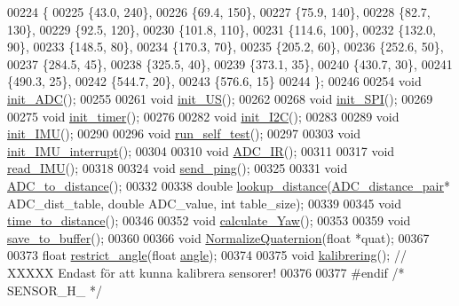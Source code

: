 \begin{DoxyCode}
00224 \{
00225     \{43.0, 240\},
00226     \{69.4, 150\},
00227     \{75.9, 140\},
00228     \{82.7, 130\},
00229     \{92.5, 120\},
00230     \{101.8, 110\},
00231     \{114.6, 100\},
00232     \{132.0, 90\},
00233     \{148.5, 80\},
00234     \{170.3, 70\},
00235     \{205.2, 60\},
00236     \{252.6, 50\},
00237     \{284.5, 45\},
00238     \{325.5, 40\},
00239     \{373.1, 35\},
00240     \{430.7, 30\},
00241     \{490.3, 25\},
00242     \{544.7, 20\},
00243     \{576.6, 15\}
00244 \};  
00246 
00254 \textcolor{keywordtype}{void} \hyperlink{sensor_8h_a342ab07b607f3dc4efa0655ca1acd164}{init\_ADC}();
00255 
00261 \textcolor{keywordtype}{void} \hyperlink{sensor_8h_a16afe9a4d2627f3f7f1bab054d4ad7ad}{init\_US}();
00262 
00268 \textcolor{keywordtype}{void} \hyperlink{sensor_8h_a1065be4c03eff55f82e136ccb95a2854}{init\_SPI}();
00269 
00275 \textcolor{keywordtype}{void} \hyperlink{sensor_8h_a38016ab7b2931bcb950e0c6f3ba3f342}{init\_timer}();
00276 
00282 \textcolor{keywordtype}{void} \hyperlink{sensor_8h_a87c8819d26491fb701918e147117710c}{init\_I2C}();
00283 
00289 \textcolor{keywordtype}{void} \hyperlink{sensor_8h_a1009b8de0745458d734bd73beda5ea25}{init\_IMU}();
00290 
00296 \textcolor{keywordtype}{void} \hyperlink{sensor_8h_abf51091638bfe4a1e4479fa12a95b0a9}{run\_self\_test}();
00297 
00303 \textcolor{keywordtype}{void} \hyperlink{sensor_8h_ad53a97524cf65efb444e93e9061d9353}{init\_IMU\_interrupt}();
00304 
00310 \textcolor{keywordtype}{void} \hyperlink{sensor_8h_a41da5db2af35bde04662acc0c8ed5e22}{ADC\_IR}();
00311 
00317 \textcolor{keywordtype}{void} \hyperlink{sensor_8h_ad5232fda58bb026c495517be3c84307a}{read\_IMU}();
00318 
00324 \textcolor{keywordtype}{void} \hyperlink{sensor_8h_ae0b3db1a7cd93a0205ff39ef05844259}{send\_ping}();
00325 
00331 \textcolor{keywordtype}{void} \hyperlink{sensor_8h_ad15899f7d08c246d74789f75dd145035}{ADC\_to\_distance}();
00332 
00338 \textcolor{keywordtype}{double} \hyperlink{sensor_8h_a074b774196f608f2234e624682b55967}{lookup\_distance}(\hyperlink{struct_a_d_c__distance__pair}{ADC\_distance\_pair}* ADC\_dist\_table, \textcolor{keywordtype}{double} ADC\_value,
       \textcolor{keywordtype}{int} table\_size);
00339 
00345 \textcolor{keywordtype}{void} \hyperlink{sensor_8h_a4400365e5a5de20eeaf4e78531e39e9b}{time\_to\_distance}();
00346 
00352 \textcolor{keywordtype}{void} \hyperlink{sensor_8h_a5611f3fef1c7ebe6f76d952adf576e86}{calculate\_Yaw}();
00353 
00359 \textcolor{keywordtype}{void} \hyperlink{sensor_8h_a387deb5b003e6eec445d95d9b30717f4}{save\_to\_buffer}();
00360 
00366 \textcolor{keywordtype}{void} \hyperlink{sensor_8h_ad838d8be45b7b7018e394ec9319e3795}{NormalizeQuaternion}(\textcolor{keywordtype}{float} *quat);
00367 
00373 \textcolor{keywordtype}{float} \hyperlink{sensor_8h_abf62ec6a8b0cc932582548dbd5032901}{restrict\_angle}(\textcolor{keywordtype}{float} \hyperlink{styr_2styr_2main_8c_ab8ef1bf8a70cc07c6d55823c390a7e76}{angle});
00374 
00375 \textcolor{keywordtype}{void} \hyperlink{sensor_8h_ac6723e64e3c0cb29dcf2a13409964453}{kalibrering}();      \textcolor{comment}{// XXXXX Endast för att kunna kalibrera sensorer!}
00376 
00377 \textcolor{preprocessor}{#endif }\textcolor{comment}{/* SENSOR\_H\_ */}\textcolor{preprocessor}{}
\end{DoxyCode}
